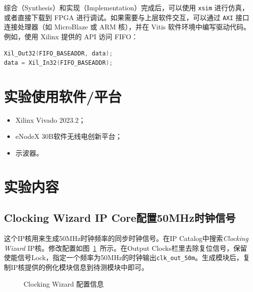 \documentclass[lang=cn,newtx,10pt,scheme=chinese]{elegantbook}
\begin{document}
综合（Synthesis）和实现（Implementation）完成后，可以使用 \texttt{xsim} 进行仿真，或者直接下载到 FPGA 进行调试。如果需要与上层软件交互，可以通过 \texttt{AXI} 接口连接处理器（如 MicroBlaze 或 ARM 核），并在 Vitis 软件环境中编写驱动代码。例如，使用 Xilinx 提供的 API 访问 FIFO：
\begin{lstlisting}[language=C++]
Xil_Out32(FIFO_BASEADDR, data);
data = Xil_In32(FIFO_BASEADDR);
\end{lstlisting}


\section{实验使用软件/平台}
\begin{itemize}
  \item Xilinx Vivado 2023.2；
  \item eNodeX 30B软件无线电创新平台；
  \item 示波器。
\end{itemize}
\section{实验内容}
\subsection{Clocking Wizard IP Core配置50MHz时钟信号}
这个IP核用来生成50MHz时钟频率的同步时钟信号。在IP Catalog中搜索\textit{Clocking Wizard} IP核。修改配置如图~\ref{fig:exp3:clk-1}~所示。在Output Clocks栏里去除复位信号，保留使能信号Lock，指定一个频率为50MHz的时钟输出\texttt{clk\_out\_50m}。生成模块后，复制IP核提供的例化模块信息到待测模块中即可。

\begin{figure}[htbp]
  \centering
  \hfill
  \caption{Clocking Wizard 配置信息}
  \label{fig:exp3:clk-1}
\end{figure}
\end{document}
